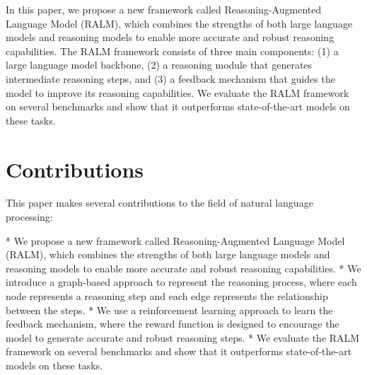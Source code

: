 \documentclass{article}
\begin{document}
In this paper, we propose a new framework called Reasoning-Augmented Language Model (RALM), which combines the strengths of both large language models and reasoning models to enable more accurate and robust reasoning capabilities. The RALM framework consists of three main components: (1) a large language model backbone, (2) a reasoning module that generates intermediate reasoning steps, and (3) a feedback mechanism that guides the model to improve its reasoning capabilities. We evaluate the RALM framework on several benchmarks and show that it outperforms state-of-the-art models on these tasks.

\section{Contributions}

This paper makes several contributions to the field of natural language processing:

* We propose a new framework called Reasoning-Augmented Language Model (RALM), which combines the strengths of both large language models and reasoning models to enable more accurate and robust reasoning capabilities.
* We introduce a graph-based approach to represent the reasoning process, where each node represents a reasoning step and each edge represents the relationship between the steps.
* We use a reinforcement learning approach to learn the feedback mechanism, where the reward function is designed to encourage the model to generate accurate and robust reasoning steps.
* We evaluate the RALM framework on several benchmarks and show that it outperforms state-of-the-art models on these tasks.
\end{document}
